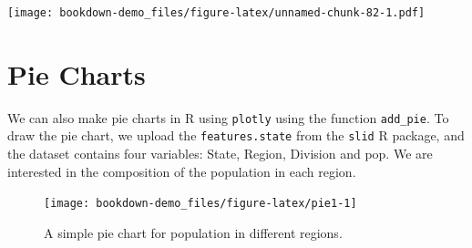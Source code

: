 \documentclass[]{book}
\newenvironment{Shaded}{\begin{snugshade}}{\end{snugshade}}
\newcommand{\KeywordTok}[1]{\textcolor[rgb]{0.13,0.29,0.53}{\textbf{#1}}}
\newcommand{\DataTypeTok}[1]{\textcolor[rgb]{0.13,0.29,0.53}{#1}}
\newcommand{\FloatTok}[1]{\textcolor[rgb]{0.00,0.00,0.81}{#1}}
\newcommand{\StringTok}[1]{\textcolor[rgb]{0.31,0.60,0.02}{#1}}
\newcommand{\OtherTok}[1]{\textcolor[rgb]{0.56,0.35,0.01}{#1}}
\newcommand{\OperatorTok}[1]{\textcolor[rgb]{0.81,0.36,0.00}{\textbf{#1}}}
\newcommand{\NormalTok}[1]{#1}
\begin{document}
\begin{Shaded}
\end{Shaded}

\texttt{[image: bookdown-demo\_files/figure-latex/unnamed-chunk-82-1.pdf]}

\section{Pie Charts}\label{pie-charts}

We can also make pie charts in R using \texttt{plotly} using the
function \texttt{add\_pie}. To draw the pie chart, we upload the
\texttt{features.state} from the \texttt{slid} R package, and the
dataset contains four variables: State, Region, Division and pop. We are
interested in the composition of the population in each region.

\begin{figure}

{\centering \texttt{[image: bookdown-demo\_files/figure-latex/pie1-1]} 

}

\caption{A simple pie chart for population in different regions.}\label{fig:pie1}
\end{figure}
\end{document}
